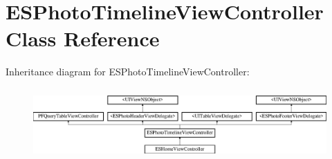 \hypertarget{interface_e_s_photo_timeline_view_controller}{}\section{E\+S\+Photo\+Timeline\+View\+Controller Class Reference}
\label{interface_e_s_photo_timeline_view_controller}
Inheritance diagram for E\+S\+Photo\+Timeline\+View\+Controller\+:\begin{figure}[H]
\begin{center}
\leavevmode
\includegraphics[height=2.772277cm]{interface_e_s_photo_timeline_view_controller}
\end{center}
\end{figure}
